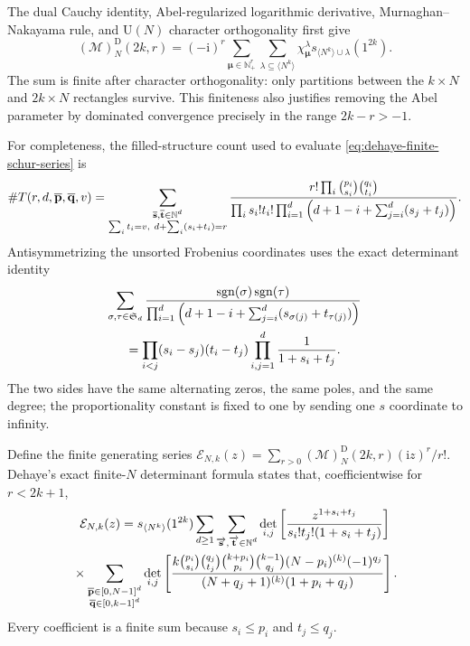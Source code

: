The dual Cauchy identity, Abel-regularized logarithmic derivative, Murnaghan--
Nakayama rule, and $\mathrm U(N)$ character orthogonality first give
\begin{equation}
 (\mathcal M)_N^{\mathrm D}(2k,r)
 =(-\mathrm i)^r
 \sum_{\boldsymbol\mu\in\mathbb N_+^r}
 \sum_{\lambda\subseteq\langle N^k\rangle}
 \chi_{\boldsymbol\mu}^{\lambda}
 s_{\langle N^k\rangle\cup\lambda}(1^{2k}).
 \label{eq:dehaye-finite-schur-series}
\end{equation}
The sum is finite after character orthogonality: only partitions between the
$k\times N$ and $2k\times N$ rectangles survive.  This finiteness also justifies
removing the Abel parameter by dominated convergence precisely in the range
$2k-r>-1$.

For completeness, the filled-structure count used to evaluate
\eqref{eq:dehaye-finite-schur-series} is
\begin{multline}
 \#T(r,d,{\overline{\mathbf{p}}},{\overline{\mathbf{q}}},v)
 =\sum_{\substack{{\overline{\mathbf{s}}},{\overline{\mathbf{t}}}\in\mathbb N^d\\
 \sum_i t_i=v,\ d+\sum_i(s_i+t_i)=r}}
 \frac{r!\prod_i\binom{p_i}{s_i}\binom{q_i}{t_i}}
 {\prod_i s_i!t_i!\prod_{i=1}^{d}
  \left(d+1-i+\sum_{j=i}^{d}(s_j+t_j)\right)}.
 \label{eq:dehaye-filled-structure-count}
\end{multline}
Antisymmetrizing the unsorted Frobenius coordinates uses the exact determinant
identity
\begin{multline}
 \sum_{\sigma,\tau\in\mathfrak S_d}
 \frac{\operatorname{sgn}(\sigma)\operatorname{sgn}(\tau)}
 {\prod_{i=1}^{d}\left(d+1-i+
  \sum_{j=i}^{d}(s_{\sigma(j)}+t_{\tau(j)})\right)}\\
 =\prod_{i<j}(s_i-s_j)(t_i-t_j)
  \prod_{i,j=1}^{d}\frac1{1+s_i+t_j}.
 \label{eq:dehaye-alternating-cauchy-identity}
\end{multline}
The two sides have the same alternating zeros, the same poles, and the same degree;
the proportionality constant is fixed to one by sending one $s$ coordinate to
infinity.

Define the finite generating series
$\mathcal E_{N,k}(z)=\sum_{r>0}(\mathcal M)_N^{\mathrm D}(2k,r)
(\mathrm iz)^r/r!$.  Dehaye's exact finite-$N$ determinant formula states that,
coefficientwise for $r<2k+1$,
\begin{multline}
 \mathcal E_{N,k}(z)=s_{\langle N^k\rangle}(1^{2k})
 \sum_{d\geq1}\sum_{\substack{{\overrightarrow{\mathbf{s}}},{\overrightarrow{\mathbf{t}}}\in\mathbb N^d}}
 \det_{i,j}\left[\frac{z^{1+s_i+t_j}}
 {s_i!t_j!(1+s_i+t_j)}\right]\\
 {}\times\sum_{\substack{{\overline{\mathbf{p}}}\in[0,N-1]^d\\
 {\overline{\mathbf{q}}}\in[0,k-1]^d}}
 \det_{i,j}\left[
 \frac{k\binom{p_i}{s_i}\binom{q_j}{t_j}
 \binom{k+p_i}{p_i}\binom{k-1}{q_j}(N-p_i)^{(k)}(-1)^{q_j}}
 {(N+q_j+1)^{(k)}(1+p_i+q_j)}
 \right].
 \label{eq:dehaye-finite-determinant-series}
\end{multline}
Every coefficient is a finite sum because $s_i\leq p_i$ and $t_j\leq q_j$.

